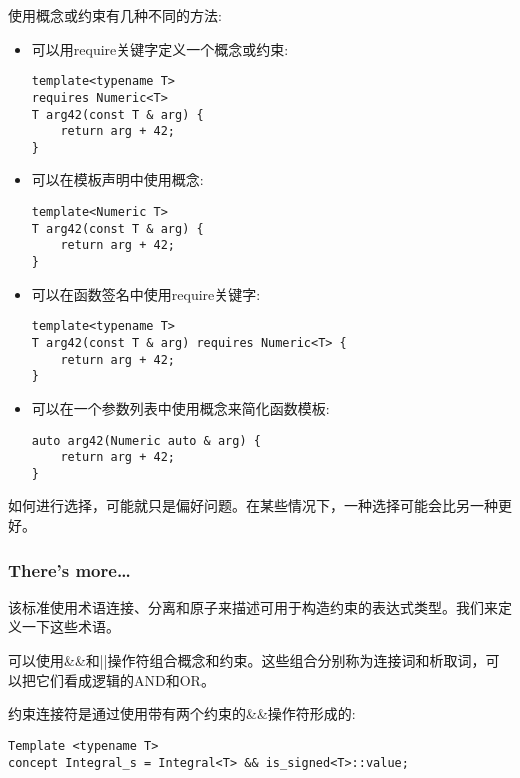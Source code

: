 使用概念或约束有几种不同的方法:

\begin{itemize}
\item 
可以用require关键字定义一个概念或约束:

\begin{lstlisting}[style=styleCXX]
template<typename T>
requires Numeric<T>
T arg42(const T & arg) {
	return arg + 42;
}
\end{lstlisting}


\item 
可以在模板声明中使用概念:

\begin{lstlisting}[style=styleCXX]
template<Numeric T>
T arg42(const T & arg) {
	return arg + 42;
}
\end{lstlisting}

\item 
可以在函数签名中使用require关键字:

\begin{lstlisting}[style=styleCXX]
template<typename T>
T arg42(const T & arg) requires Numeric<T> {
	return arg + 42;
}
\end{lstlisting}

\item 
可以在一个参数列表中使用概念来简化函数模板:

\begin{lstlisting}[style=styleCXX]
auto arg42(Numeric auto & arg) {
	return arg + 42;
}
\end{lstlisting}
\end{itemize}

如何进行选择，可能就只是偏好问题。在某些情况下，一种选择可能会比另一种更好。

\subsubsection{There's more…}

该标准使用术语连接、分离和原子来描述可用于构造约束的表达式类型。我们来定义一下这些术语。

可以使用\&\&和||操作符组合概念和约束。这些组合分别称为连接词和析取词，可以把它们看成逻辑的AND和OR。

约束连接符是通过使用带有两个约束的\&\&操作符形成的:

\begin{lstlisting}[style=styleCXX]
Template <typename T>
concept Integral_s = Integral<T> && is_signed<T>::value;
\end{lstlisting}


